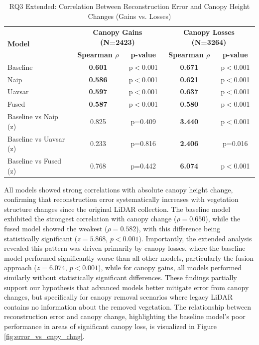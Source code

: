 \documentclass[preprints,article,accept,pdftex,moreauthors]{Definitions/mdpi}
\begin{document}
\begin{table}[htbp]
\centering
\caption{RQ3 Extended: Correlation Between Reconstruction Error and Canopy Height Changes (Gains vs. Losses)}
\begin{tabular}{lcccc}
\toprule
\multirow{2}{*}{\textbf{Model}} & \multicolumn{2}{c}{\textbf{Canopy Gains (N=2423)}} & \multicolumn{2}{c}{\textbf{Canopy Losses (N=3264)}} \\
\cmidrule(lr){2-3} \cmidrule(lr){4-5}
 & \textbf{Spearman $\rho$} & \textbf{p-value} & \textbf{Spearman $\rho$} & \textbf{p-value} \\
\midrule
Baseline & \textbf{0.601} & p$<$0.001 & \textbf{0.671} & p$<$0.001 \\
Naip & \textbf{0.586} & p$<$0.001 & \textbf{0.621} & p$<$0.001 \\
Uavsar & \textbf{0.597} & p$<$0.001 & \textbf{0.637} & p$<$0.001 \\
Fused & \textbf{0.587} & p$<$0.001 & \textbf{0.580} & p$<$0.001 \\
\midrule
Baseline vs Naip (z) & 0.825 & p=0.409 & \textbf{3.440} & p$<$0.001 \\
Baseline vs Uavsar (z) & 0.233 & p=0.816 & \textbf{2.406} & p=0.016 \\
Baseline vs Fused (z) & 0.768 & p=0.442 & \textbf{6.074} & p$<$0.001 \\
\bottomrule
\end{tabular}
\label{tab:rq3_extended_results}
\end{table}


All models showed strong correlations with absolute canopy height change, confirming that reconstruction error systematically increases with vegetation structure changes since the original LiDAR collection. The baseline model exhibited the strongest correlation with canopy change ($\rho=0.650$), while the fused model showed the weakest ($\rho=0.582$), with this difference being statistically significant ($z=5.868$, $p<0.001$). Importantly, the extended analysis revealed this pattern was driven primarily by canopy losses, where the baseline model performed significantly worse than all other models, particularly the fusion approach ($z=6.074$, $p<0.001$), while for canopy gains, all models performed similarly without statistically significant differences. These findings partially support our hypothesis that advanced models better mitigate error from canopy changes, but specifically for canopy removal scenarios where legacy LiDAR contains no information about the removed vegetation. The relationship between reconstruction error and canopy change, highlighting the baseline model's poor performance in areas of significant canopy loss, is visualized in Figure \ref{fig:error_vs_cnpy_chng}.
\end{document}

